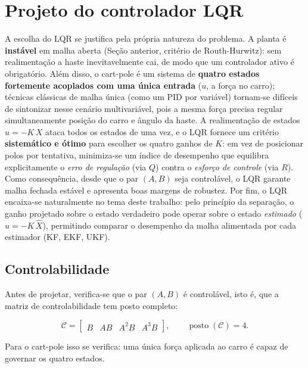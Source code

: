 \documentclass[brazil, 12pt]{article}
\begin{document}
\section{Projeto do controlador LQR}

A escolha do LQR se justifica pela própria natureza do problema. A planta é
\textbf{instável} em malha aberta (Seção anterior, critério de Routh-Hurwitz):
sem realimentação a haste inevitavelmente cai, de modo que um controlador ativo
é obrigatório. Além disso, o cart-pole é um sistema de \textbf{quatro estados
fortemente acoplados com uma única entrada} ($u$, a força no carro); técnicas
clássicas de malha única (como um PID por variável) tornam-se difíceis de
sintonizar nesse cenário multivariável, pois a mesma força precisa regular
simultaneamente posição do carro e ângulo da haste. A realimentação de estados
$u = -K\,X$ ataca todos os estados de uma vez, e o LQR fornece um critério
\textbf{sistemático e ótimo} para escolher os quatro ganhos de $K$: em vez de
posicionar polos por tentativa, minimiza-se um índice de desempenho que
equilibra explicitamente o \emph{erro de regulação} (via $Q$) contra o
\emph{esforço de controle} (via $R$). Como consequência, desde que o par $(A,B)$
seja controlável, o LQR garante malha fechada estável e apresenta boas margens
de robustez. Por fim, o LQR encaixa-se naturalmente no tema deste trabalho: pelo
princípio da separação, o ganho projetado sobre o estado verdadeiro pode operar
sobre o estado \emph{estimado} ($u = -K\,\hat{X}$), permitindo comparar o
desempenho da malha alimentada por cada estimador (KF, EKF, UKF).

\subsection{Controlabilidade}

Antes de projetar, verifica-se que o par $(A,B)$ é controlável, isto é, que a
matriz de controlabilidade tem posto completo:

\[
\mathcal{C} = \begin{bmatrix} B & AB & A^{2}B & A^{3}B \end{bmatrix},
\qquad \operatorname{posto}(\mathcal{C}) = 4.
\]

Para o cart-pole isso se verifica: uma única força aplicada ao carro é capaz de
governar os quatro estados.
\end{document}
